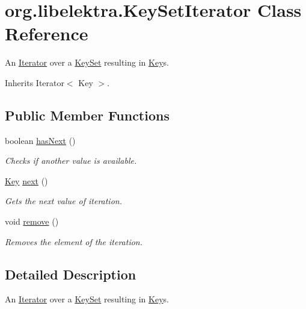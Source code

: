 \hypertarget{classorg_1_1libelektra_1_1KeySetIterator}{}\section{org.\+libelektra.\+Key\+Set\+Iterator Class Reference}
\label{classorg_1_1libelektra_1_1KeySetIterator}


An \mbox{\hyperlink{}{Iterator}} over a \mbox{\hyperlink{classorg_1_1libelektra_1_1KeySet}{Key\+Set}} resulting in \mbox{\hyperlink{classorg_1_1libelektra_1_1Key}{Key}}s.  




Inherits Iterator$<$ Key $>$.

\subsection*{Public Member Functions}
\begin{DoxyCompactItemize}
\item 
boolean \mbox{\hyperlink{classorg_1_1libelektra_1_1KeySetIterator_a5e1ac38d123fdf1613f9a9258ef009a7}{has\+Next}} ()
\begin{DoxyCompactList}\small\item\em Checks if another value is available. \end{DoxyCompactList}\item 
\mbox{\hyperlink{classorg_1_1libelektra_1_1Key}{Key}} \mbox{\hyperlink{classorg_1_1libelektra_1_1KeySetIterator_aaa1cd283e898fd4c96ec44faade6effd}{next}} ()
\begin{DoxyCompactList}\small\item\em Gets the next value of iteration. \end{DoxyCompactList}\item 
\mbox{\label{classorg_1_1libelektra_1_1KeySetIterator_acc5e88865016b39a9f5c255935615255}} 
void \mbox{\hyperlink{classorg_1_1libelektra_1_1KeySetIterator_acc5e88865016b39a9f5c255935615255}{remove}} ()
\begin{DoxyCompactList}\small\item\em Removes the element of the iteration. \end{DoxyCompactList}\end{DoxyCompactItemize}


\subsection{Detailed Description}
An \mbox{\hyperlink{}{Iterator}} over a \mbox{\hyperlink{classorg_1_1libelektra_1_1KeySet}{Key\+Set}} resulting in \mbox{\hyperlink{classorg_1_1libelektra_1_1Key}{Key}}s. 

